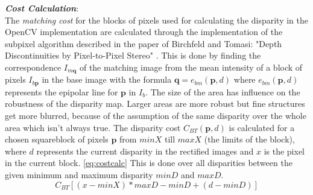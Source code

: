 \documentclass[a4paper]{article}
\begin{document}
\emph{\textbf{Cost Calculation}}:\\
The \emph{matching cost} for the blocks of pixels used for calculating
the disparity in the OpenCV implementation are calculated through the
implementation of the subpixel algorithm described in the paper of
Birchfeld and Tomasi: "Depth Discontinuities by Pixel-to-Pixel Stereo"
\cite{birchtom99}. This is done by finding the correspondence
$I_{m\mathbf{q}}$ of the matching image from the mean intensity of a
block of pixels $I_{b\mathbf{p}}$ in the base image with the formula
$\mathbf{q} = e_{bm}(\mathbf{p}, d)$ where
$e_{bm}(\mathbf{p}, d)$ represents the epipolar line for
$\mathbf{p}$ in $I_b$. The size of the area has influence on the
robustness of the disparity map. Larger areas are more robust but fine
structures get more blurred, because of the assumption of the same
disparity over the whole area which isn't always true. The disparity
cost $C_{BT}( \mathbf{p},d)$ is calculated for a chosen squareblock of
pixels $\mathbf{p}$ from $minX$ till $maxX$ (the limits of the block),
where $d$ represents the current disparity in the rectified images and
$x$ is the pixel in the current block. \eqref{eq:costcalc} This is
done over all disparities between the given minimum and maximum
disparity $minD$ and $maxD$.\\
\begin{equation}
  \label{eq:costcalc}
  C_{BT}[(x-minX)*maxD - minD + (d - minD)]
\end{equation}
\end{document}
